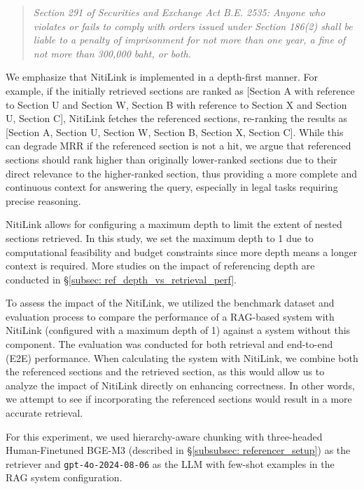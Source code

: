 \begin{quote}
    \textit{Section 291 of Securities and Exchange Act B.E. 2535: Anyone who violates or fails to comply with orders issued under Section 186(2) shall be liable to a penalty of imprisonment for not more than one year, a fine of not more than 300,000 baht, or both.}
\end{quote}

We emphasize that NitiLink is implemented in a depth-first manner. 
%
For example, if the initially retrieved sections are ranked as [Section A with reference to Section U and Section W, Section B with reference to Section X and Section U, Section C], NitiLink fetches the referenced sections, re-ranking the results as [Section A, Section U, Section W, Section B, Section X, Section C]. 
%
While this can degrade MRR if the referenced section is not a hit, we argue that referenced sections should rank higher than originally lower-ranked sections due to their direct relevance to the higher-ranked section, thus providing a more complete and continuous context for answering the query, especially in legal tasks requiring precise reasoning.

NitiLink allows for configuring a maximum depth to limit the extent of nested sections retrieved.
%
In this study, we set the maximum depth to 1 due to computational feasibility and budget constraints since more depth means a longer context is required. 
%
More studies on the impact of referencing depth are conducted in \S\ref{subsec: ref_depth_vs_retrieval_perf}.

To assess the impact of the NitiLink, we utilized the benchmark dataset and evaluation process to compare the performance of a RAG-based system with NitiLink (configured with a maximum depth of 1) against a system without this component. 
%
The evaluation was conducted for both retrieval and end-to-end (E2E) performance. 
%
When calculating the system with NitiLink, we combine both the referenced sections and the retrieved section, as this would allow us to analyze the impact of NitiLink directly on enhancing correctness. 
%
In other words, we attempt to see if incorporating the referenced sections would result in a more accurate retrieval.

For this experiment, we used hierarchy-aware chunking with three-headed Human-Finetuned BGE-M3 (described in \S\ref{subsubsec: referencer_setup}) as the retriever and \texttt{gpt-4o-2024-08-06} as the LLM with few-shot examples in the RAG system configuration.

